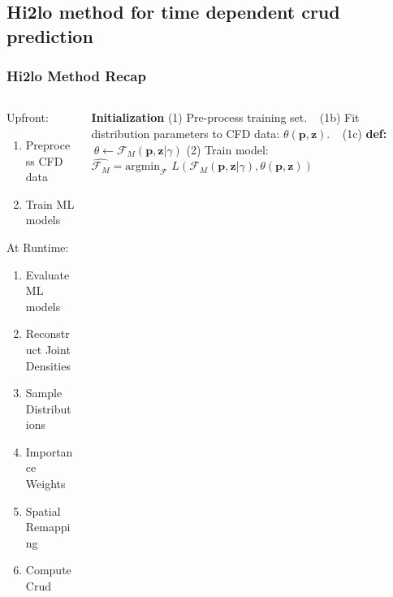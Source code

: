 \documentclass[t, pdftex]{beamer}
\begin{document}
\subsection*{Hi2lo method for time dependent crud prediction}
\begin{frame}
\frametitle{Hi2lo Method Recap}
\vspace{-28pt}
\begin{columns}
     \vspace{22pt}
    \begin{column}{0.5\textwidth}
        
        Upfront:
        \begin{enumerate}
            \item Preprocess CFD data
            \item Train ML models
         \end{enumerate}
     \vspace{18pt}
        At Runtime:
         \begin{enumerate}
            \item Evaluate ML models
            \item Reconstruct Joint Densities
            \item Sample Distributions
            \item Importance Weights
            \item Spatial Remapping
            \item Compute Crud
        \end{enumerate}
    \end{column}
 \begin{column}{0.5\textwidth}
\begin{algorithm}[H]
    \tiny      
    \begin{algorithmic}[1]      
        \STATE \textbf{Initialization}  
        \STATE (1) Pre-process training set.  
        \STATE $\ \ $   (1b) Fit distribution parameters to CFD data: $\theta(\mathbf p, \mathbf z)$.  
        \STATE $\ \ $   (1c) \textbf{def:}  $\ \theta \leftarrow \mathcal F_M(\mathbf p, \mathbf z | \gamma)$
        \STATE (2) Train model:  \\ $\hat{\mathcal F_M} =  \mathrm{argmin}_{\mathcal F}$ 
        $L(\mathcal{F}_M (\mathbf p, \mathbf z| \gamma), \theta(\mathbf p, \mathbf z)) $

\end{algorithmic}
\end{algorithm}
\end{column}
\end{columns}
\end{frame}
\end{document}
